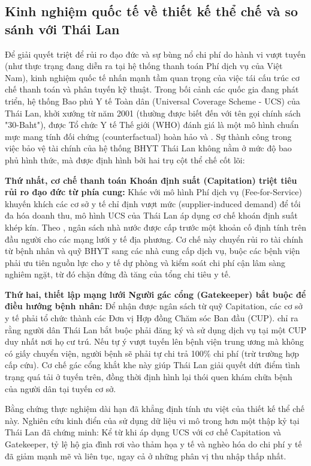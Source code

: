 \documentclass[12pt,a4paper]{article}
\begin{document}
\subsection{Kinh nghiệm quốc tế về thiết kế thể chế và so sánh với Thái Lan}

Để giải quyết triệt để rủi ro đạo đức và sự bùng nổ chi phí do hành vi vượt tuyến (như thực trạng đang diễn ra tại hệ thống thanh toán Phí dịch vụ của Việt Nam), kinh nghiệm quốc tế nhấn mạnh tầm quan trọng của việc tái cấu trúc cơ chế thanh toán và phân tuyến kỹ thuật. Trong bối cảnh các quốc gia đang phát triển, hệ thống Bao phủ Y tế Toàn dân (Universal Coverage Scheme - UCS) của Thái Lan, khởi xướng từ năm 2001 (thường được biết đến với tên gọi chính sách "30-Baht"), được Tổ chức Y tế Thế giới (WHO) đánh giá là một mô hình chuẩn mực mang tính đối chứng (counterfactual) hoàn hảo \parencite{pongpirul2009} và \parencite{tangcharoensathien2011}. Sự thành công trong việc bảo vệ tài chính của hệ thống BHYT Thái Lan không nằm ở mức độ bao phủ hình thức, mà được định hình bởi hai trụ cột thể chế cốt lõi:

\textbf{Thứ nhất, cơ chế thanh toán Khoán định suất (Capitation) triệt tiêu rủi ro đạo đức từ phía cung:} Khác với mô hình Phí dịch vụ (Fee-for-Service) khuyến khích các cơ sở y tế chỉ định vượt mức (supplier-induced demand) để tối đa hóa doanh thu, mô hình UCS của Thái Lan áp dụng cơ chế khoán định suất khép kín. Theo \textcite{mills2014}, ngân sách nhà nước được cấp trước một khoản cố định tính trên đầu người cho các mạng lưới y tế địa phương. Cơ chế này chuyển rủi ro tài chính từ bệnh nhân và quỹ BHYT sang các nhà cung cấp dịch vụ, buộc các bệnh viện phải ưu tiên nguồn lực cho y tế dự phòng và kiểm soát chi phí cận lâm sàng nghiêm ngặt, từ đó chặn đứng đà tăng của tổng chi tiêu y tế.


\textbf{Thứ hai, thiết lập mạng lưới Người gác cổng (Gatekeeper) bắt buộc để điều hướng bệnh nhân:} Để nhận được ngân sách từ quỹ Capitation, các cơ sở y tế phải tổ chức thành các Đơn vị Hợp đồng Chăm sóc Ban đầu (CUP). \textcite{pongpirul2011} chỉ ra rằng người dân Thái Lan bắt buộc phải đăng ký và sử dụng dịch vụ tại một CUP duy nhất nơi họ cư trú. Nếu tự ý vượt tuyến lên bệnh viện trung ương mà không có giấy chuyển viện, người bệnh sẽ phải tự chi trả 100\% chi phí (trừ trường hợp cấp cứu). Cơ chế gác cổng khắt khe này giúp Thái Lan giải quyết dứt điểm tình trạng quá tải ở tuyến trên, đồng thời định hình lại thói quen khám chữa bệnh của người dân tại tuyến cơ sở.

Bằng chứng thực nghiệm dài hạn đã khẳng định tính ưu việt của thiết kế thể chế này. Nghiên cứu kinh điển của \textcite{limwattananon2015} sử dụng dữ liệu vi mô trong hơn một thập kỷ tại Thái Lan đã chứng minh: Kể từ khi áp dụng UCS với cơ chế Capitation và Gatekeeper, tỷ lệ hộ gia đình rơi vào thảm họa y tế và nghèo hóa do chi phí y tế đã giảm mạnh mẽ và liên tục, ngay cả ở những phân vị thu nhập thấp nhất. 
\end{document}

